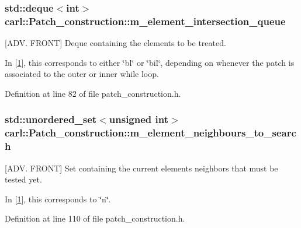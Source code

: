 \subsubsection[{m\+\_\+element\+\_\+intersection\+\_\+queue}]{\setlength{\rightskip}{0pt plus 5cm}std\+::deque$<$int$>$ carl\+::\+Patch\+\_\+construction\+::m\+\_\+element\+\_\+intersection\+\_\+queue\hspace{0.3cm}{\ttfamily [protected]}}\label{classcarl_1_1_patch__construction_afb05a2bad18a8c6fa0287ae44a246687}


\mbox{[}A\+D\+V. F\+R\+O\+N\+T\mbox{]} Deque containing the elements to be treated. 

In \mbox{[}\hyperlink{classcarl_1_1_patch__construction_Gander_article}{1}\mbox{]}, this corresponds to either \char`\"{}bl\char`\"{} or \char`\"{}bil\char`\"{}, depending on whenever the patch is associated to the outer or inner \textquotesingle{}while\textquotesingle{} loop. 

Definition at line 82 of file patch\+\_\+construction.\+h.

\hypertarget{classcarl_1_1_patch__construction_a73186b0129fff50276de0c1eabd5ea0d}{}
\subsubsection[{m\+\_\+element\+\_\+neighbours\+\_\+to\+\_\+search}]{\setlength{\rightskip}{0pt plus 5cm}std\+::unordered\+\_\+set$<$unsigned int$>$ carl\+::\+Patch\+\_\+construction\+::m\+\_\+element\+\_\+neighbours\+\_\+to\+\_\+search\hspace{0.3cm}{\ttfamily [protected]}}\label{classcarl_1_1_patch__construction_a73186b0129fff50276de0c1eabd5ea0d}


\mbox{[}A\+D\+V. F\+R\+O\+N\+T\mbox{]} Set containing the current element\textquotesingle{}s neighbors that must be tested yet. 

In \mbox{[}\hyperlink{classcarl_1_1_patch__construction_Gander_article}{1}\mbox{]}, this corresponds to \char`\"{}n\char`\"{}. 

Definition at line 110 of file patch\+\_\+construction.\+h.

\hypertarget{classcarl_1_1_patch__construction_a4afa35f6be957a083ac586ae158b55dc}{}
